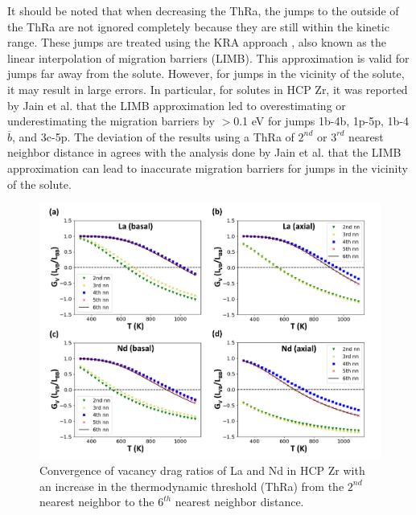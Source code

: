 \documentclass[preprint,12pt]{elsarticle}
\begin{document}
It should be noted that when decreasing the ThRa, the jumps to the outside of the ThRa are not ignored completely because they are still within the kinetic range. These jumps are treated using the KRA approach \cite{van_der_ven_first_2005}, also known as the linear interpolation of migration barriers (LIMB). This approximation is valid for jumps far away from the solute. However, for jumps in the vicinity of the solute, it may result in large errors. In particular, for solutes in HCP Zr, it was reported by Jain et al.\cite{jain_first-principles_2019} that the LIMB approximation led to overestimating or underestimating the migration barriers by $>$0.1 eV for jumps 1b-4b, 1p-5p, 1b-4$\overline{b}$, and 3c-5p. The deviation of the results using a ThRa of $2^{nd}$ or $3^{rd}$ nearest neighbor distance in  agrees with the analysis done by Jain et al. that the LIMB approximation can lead to inaccurate migration barriers for jumps in the vicinity of the solute.

\begin{figure}[h!]
    \centering
    \includegraphics[width=\textwidth]{nn_convergence.jpg}
    \caption{Convergence of vacancy drag ratios of La and Nd in HCP Zr with an increase in the thermodynamic threshold (ThRa) from the $2^{nd}$ nearest neighbor to the $6^{th}$ nearest neighbor distance.}
    \label{fig:convergence_nn}
\end{figure}
\end{document}
